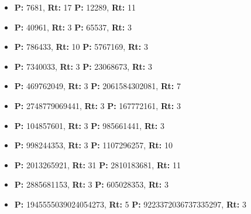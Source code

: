 \begin{scriptsize} %
\begin{itemize}
    \setlength\itemsep{0em} %
    \item \textbf{P:} 7681, \textbf{Rt:} 17 \hfill \textbf{P:} 12289, \textbf{Rt:} 11
    \item \textbf{P:} 40961, \textbf{Rt:} 3 \hfill \textbf{P:} 65537, \textbf{Rt:} 3
    \item \textbf{P:} 786433, \textbf{Rt:} 10 \hfill \textbf{P:} 5767169, \textbf{Rt:} 3
    \item \textbf{P:} 7340033, \textbf{Rt:} 3 \hfill \textbf{P:} 23068673, \textbf{Rt:} 3
    \item \textbf{P:} 469762049, \textbf{Rt:} 3 \hfill \textbf{P:} 2061584302081, \textbf{Rt:} 7
    \item \textbf{P:} 2748779069441, \textbf{Rt:} 3 \hfill \textbf{P:} 167772161, \textbf{Rt:} 3
    \item \textbf{P:} 104857601, \textbf{Rt:} 3 \hfill \textbf{P:} 985661441, \textbf{Rt:} 3
    \item \textbf{P:} 998244353, \textbf{Rt:} 3 \hfill \textbf{P:} 1107296257, \textbf{Rt:} 10
    \item \textbf{P:} 2013265921, \textbf{Rt:} 31 \hfill \textbf{P:} 2810183681, \textbf{Rt:} 11
    \item \textbf{P:} 2885681153, \textbf{Rt:} 3 \hfill \textbf{P:} 605028353, \textbf{Rt:} 3
    \item \textbf{P:} 1945555039024054273, \textbf{Rt:} 5 \hfill \textbf{P:} 9223372036737335297, \textbf{Rt:} 3
\end{itemize}
\end{scriptsize}